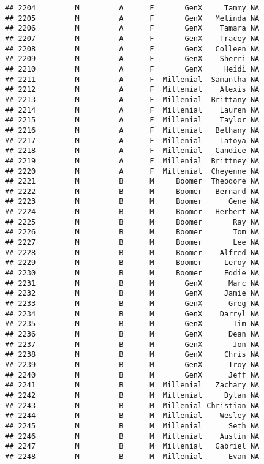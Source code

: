 \documentclass[
]{article}
\begin{document}
\begin{verbatim}
## 2204         M         A      F       GenX     Tammy NA
## 2205         M         A      F       GenX   Melinda NA
## 2206         M         A      F       GenX    Tamara NA
## 2207         M         A      F       GenX    Tracey NA
## 2208         M         A      F       GenX   Colleen NA
## 2209         M         A      F       GenX    Sherri NA
## 2210         M         A      F       GenX     Heidi NA
## 2211         M         A      F  Millenial  Samantha NA
## 2212         M         A      F  Millenial    Alexis NA
## 2213         M         A      F  Millenial  Brittany NA
## 2214         M         A      F  Millenial    Lauren NA
## 2215         M         A      F  Millenial    Taylor NA
## 2216         M         A      F  Millenial   Bethany NA
## 2217         M         A      F  Millenial    Latoya NA
## 2218         M         A      F  Millenial   Candice NA
## 2219         M         A      F  Millenial  Brittney NA
## 2220         M         A      F  Millenial  Cheyenne NA
## 2221         M         B      M     Boomer  Theodore NA
## 2222         M         B      M     Boomer   Bernard NA
## 2223         M         B      M     Boomer      Gene NA
## 2224         M         B      M     Boomer   Herbert NA
## 2225         M         B      M     Boomer       Ray NA
## 2226         M         B      M     Boomer       Tom NA
## 2227         M         B      M     Boomer       Lee NA
## 2228         M         B      M     Boomer    Alfred NA
## 2229         M         B      M     Boomer     Leroy NA
## 2230         M         B      M     Boomer     Eddie NA
## 2231         M         B      M       GenX      Marc NA
## 2232         M         B      M       GenX     Jamie NA
## 2233         M         B      M       GenX      Greg NA
## 2234         M         B      M       GenX    Darryl NA
## 2235         M         B      M       GenX       Tim NA
## 2236         M         B      M       GenX      Dean NA
## 2237         M         B      M       GenX       Jon NA
## 2238         M         B      M       GenX     Chris NA
## 2239         M         B      M       GenX      Troy NA
## 2240         M         B      M       GenX      Jeff NA
## 2241         M         B      M  Millenial   Zachary NA
## 2242         M         B      M  Millenial     Dylan NA
## 2243         M         B      M  Millenial Christian NA
## 2244         M         B      M  Millenial    Wesley NA
## 2245         M         B      M  Millenial      Seth NA
## 2246         M         B      M  Millenial    Austin NA
## 2247         M         B      M  Millenial   Gabriel NA
## 2248         M         B      M  Millenial      Evan NA

\end{verbatim}
\end{document}
